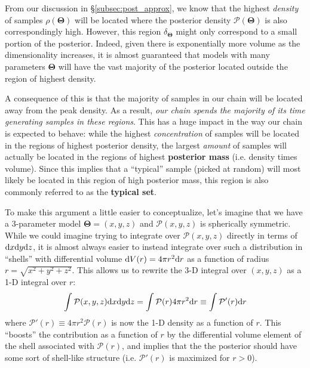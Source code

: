 \documentclass[12pt, titlepage]{article}
\newcommand{\deriv}{\ensuremath{{\rm d}}}  %
\newcommand{\params}{\ensuremath{\boldsymbol\Theta}}
\newcommand{\posterior}{\ensuremath{\mathcal{P}}}
\begin{document}
From our discussion in \S\ref{subsec:post_approx}, we know that
the highest \textit{density} of samples $\rho(\params)$
will be located where the posterior density $\posterior(\params)$
is also correspondingly high. However, this region $\delta_{\params}$
might only correspond to a small portion of the posterior. 
Indeed, given there is exponentially more volume as the dimensionality
increases, it is almost guaranteed that models with many parameters
$\params$ will have the vast majority of the posterior located
outside the region of highest density. 

A consequence of this is that
the majority of samples in our chain will be located
away from the peak density. As a result, \textit{our chain
spends the majority of its time
generating samples in these regions}.
This has a huge impact in the way our chain is expected to behave:
while the highest \textit{concentration}
of samples will be located in the regions of highest
posterior density, the largest \textit{amount} of samples
will actually be located in the regions of highest \textbf{posterior
mass} (i.e. density times volume). 
Since this implies that a ``typical'' sample 
(picked at random) will most likely be located in this
region of high posterior mass,
this region is also commonly referred to
as the \textbf{typical set}.

To make this argument a little easier to conceptualize,
let's imagine that we have a 3-parameter model $\params = (x, y, z)$ 
and $\posterior(x,y,z)$ is spherically symmetric.
While we could imagine trying to
integrate over $\posterior(x,y,z)$ directly in terms of
$\deriv x \deriv y \deriv z$, it is almost always
easier to instead integrate over such a distribution
in ``shells'' with differential volume
$\deriv V(r) = 4 \pi r^2 \deriv r$
as a function of radius
$r = \sqrt{x^2 + y^2 + z^2}$. This allows us
to rewrite the 3-D integral over $(x,y,z)$ as a 1-D integral over $r$:
\begin{equation}
    \int \posterior(x,y,z) \deriv x \deriv y \deriv z
    = \int \posterior(r) 4 \pi r^2 \deriv r
    \equiv \int \posterior'(r) \deriv r
\end{equation}
where $\posterior'(r) \equiv 4 \pi r^2 \posterior(r)$ is now
the 1-D density as a function of $r$. This ``boosts'' the contribution
as a function of $r$ by the differential volume element of the
shell associated with $\posterior(r)$, and implies that the
the posterior should have some sort of shell-like structure (i.e.
$\posterior'(r)$ is maximized for $r > 0$).
\end{document}
